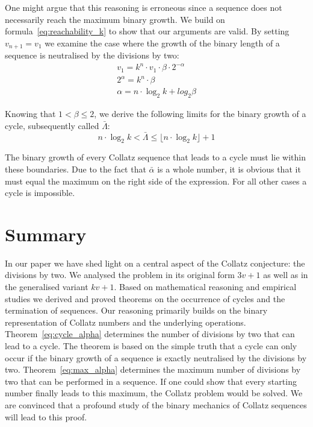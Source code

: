 \documentclass{SciPress_2015}
\renewcommand{\large}{\fontsize{14}{18pt}\selectfont}
\newcommand{\titleformat}{\sffamily\bfseries \large}						%
\begin{document}
\par\medskip
One might argue that this reasoning is erroneous since a sequence does not necessarily reach the maximum binary growth. We build on formula~\ref{eq:reachability_k} to show that our arguments are valid. By setting $v_{n+1}=v_1$ we examine the case where the growth of the binary length of a sequence is neutralised by the divisions by two:
\[
\begin{array}{l}
v_1=k^n\cdot v_1\cdot\beta\cdot2^{-\alpha}\\
2^{\alpha}=k^n\cdot\beta\\
\alpha=n\cdot\log_2k+log_2\beta
\end{array}
\]

Knowing that $1<\beta\le2$, we derive the following limits for the binary growth of a cycle, subsequently called $\bar\Lambda$:
\[
n\cdot\log_2k<\bar\Lambda\le\lfloor n\cdot\log_2k\rfloor+1
\]

The binary growth of every Collatz sequence that leads to a cycle must lie within these boundaries. Due to the fact that $\bar\alpha$ is a whole number, it is obvious that it must equal the maximum on the right side of the expression. For all other cases a cycle is impossible.

\section{Summary}
In our paper we have shed light on a central aspect of the Collatz conjecture: the divisions by two. We analysed the problem in its original form $3v+1$ as well as in the generalised variant $kv+1$. Based on mathematical reasoning and empirical studies we derived and proved theorems on the occurrence of cycles and the termination of sequences. Our reasoning primarily builds on the binary representation of Collatz numbers and the underlying operations. Theorem~\ref{eq:cycle_alpha} determines the number of divisions by two that can lead to a cycle. The theorem is based on the simple truth that a cycle can only occur if the binary growth of a sequence is exactly neutralised by the divisions by two. Theorem~\ref{eq:max_alpha} determines the maximum number of divisions by two that can be performed in a sequence. If one could show that every starting number finally leads to this maximum, the Collatz problem would be solved. We are convinced that a profound study of the binary mechanics of Collatz sequences will lead to this proof.\\

\par\bigskip\noindent
{\titleformat{Appendix}}
\end{document}
